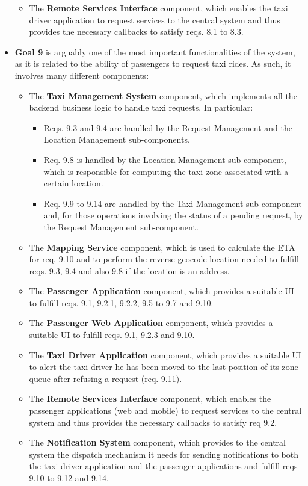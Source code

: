 \begin{itemize}
\begin{itemize}
	\item The \textbf{Remote Services Interface} component, which enables the taxi driver application to request services to the central system and thus provides the necessary callbacks to satisfy reqs. 8.1 to 8.3.
	\end{itemize}
	\item \textbf{Goal 9} is arguably one of the most important functionalities of the system, as it is related to the ability of passengers to request taxi rides. As such, it involves many different components:
	\begin{itemize}
		\item The \textbf{Taxi Management System} component, which implements all the backend business logic to handle taxi requests. In particular:
		\begin{itemize}
		\item Reqs. 9.3 and 9.4 are handled by the Request Management and the Location Management sub-components.
		\item Req. 9.8 is handled by the Location Management sub-component, which is responsible for computing the taxi zone associated with a certain location.
		\item Req. 9.9 to 9.14 are handled by the Taxi Management sub-component and, for those operations involving the status of a pending request, by the Request Management sub-component.
		\end{itemize}
		\item The \textbf{Mapping Service} component, which is used to calculate the ETA for req. 9.10 and to perform the reverse-geocode location needed to fulfill reqs. 9.3, 9.4 and also 9.8 if the location is an address.
		\item The \textbf{Passenger Application} component, which provides a suitable UI to fulfill reqs. 9.1, 9.2.1, 9.2.2, 9.5 to 9.7 and 9.10.
		\item The \textbf{Passenger Web Application} component, which provides a suitable UI to fulfill reqs. 9.1, 9.2.3 and 9.10.
		\item The \textbf{Taxi Driver Application} component, which provides a suitable UI to alert the taxi driver he has been moved to the last position of its zone queue after refusing a request (req. 9.11).
		\item The \textbf{Remote Services Interface} component, which enables the passenger applications (web and mobile) to request services to the central system and thus provides the necessary callbacks to satisfy req 9.2.
		\item The \textbf{Notification System} component, which provides to the central system the dispatch mechanism it needs for sending notifications to both the taxi driver application and the passenger applications and fulfill reqs 9.10 to 9.12 and 9.14.

\end{itemize}
\end{itemize}
